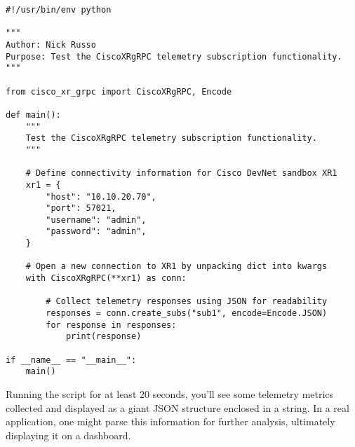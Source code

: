 \begin{verbatim}
#!/usr/bin/env python

"""
Author: Nick Russo
Purpose: Test the CiscoXRgRPC telemetry subscription functionality.
"""

from cisco_xr_grpc import CiscoXRgRPC, Encode

def main():
    """
    Test the CiscoXRgRPC telemetry subscription functionality.
    """

    # Define connectivity information for Cisco DevNet sandbox XR1
    xr1 = {
        "host": "10.10.20.70",
        "port": 57021,
        "username": "admin",
        "password": "admin",
    }

    # Open a new connection to XR1 by unpacking dict into kwargs
    with CiscoXRgRPC(**xr1) as conn:

        # Collect telemetry responses using JSON for readability
        responses = conn.create_subs("sub1", encode=Encode.JSON)
        for response in responses:
            print(response)

if __name__ == "__main__":
    main()
\end{verbatim}

Running the script for at least 20 seconds, you'll see some telemetry
metrics collected and displayed as a giant JSON structure enclosed
in a string. In a real application, one might parse this information
for further analysis, ultimately displaying it on a dashboard.

